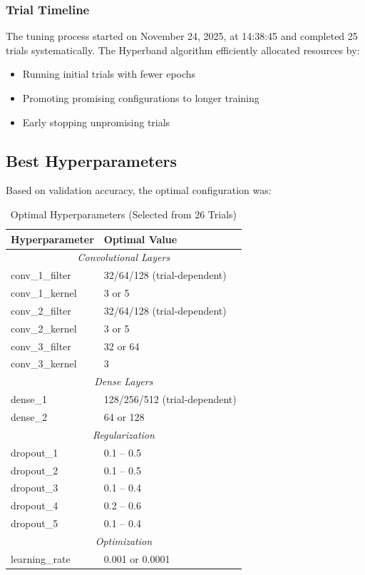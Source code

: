 \documentclass[12pt,a4paper]{article}
\begin{document}
\subsubsection{Trial Timeline}
The tuning process started on November 24, 2025, at 14:38:45 and completed 25 trials systematically. The Hyperband algorithm efficiently allocated resources by:
\begin{itemize}
    \item Running initial trials with fewer epochs
    \item Promoting promising configurations to longer training
    \item Early stopping unpromising trials
\end{itemize}

\subsection{Best Hyperparameters}

Based on validation accuracy, the optimal configuration was:

\begin{table}[H]
\centering
\caption{Optimal Hyperparameters (Selected from 26 Trials)}
\begin{tabular}{ll}
\toprule
\textbf{Hyperparameter} & \textbf{Optimal Value} \\
\midrule
\multicolumn{2}{c}{\textit{Convolutional Layers}} \\
conv\_1\_filter & 32/64/128 (trial-dependent) \\
conv\_1\_kernel & 3 or 5 \\
conv\_2\_filter & 32/64/128 (trial-dependent) \\
conv\_2\_kernel & 3 or 5 \\
conv\_3\_filter & 32 or 64 \\
conv\_3\_kernel & 3 \\
\midrule
\multicolumn{2}{c}{\textit{Dense Layers}} \\
dense\_1 & 128/256/512 (trial-dependent) \\
dense\_2 & 64 or 128 \\
\midrule
\multicolumn{2}{c}{\textit{Regularization}} \\
dropout\_1 & 0.1 -- 0.5 \\
dropout\_2 & 0.1 -- 0.5 \\
dropout\_3 & 0.1 -- 0.4 \\
dropout\_4 & 0.2 -- 0.6 \\
dropout\_5 & 0.1 -- 0.4 \\
\midrule
\multicolumn{2}{c}{\textit{Optimization}} \\
learning\_rate & 0.001 or 0.0001 \\
\bottomrule
\end{tabular}
\end{table}
\end{document}
